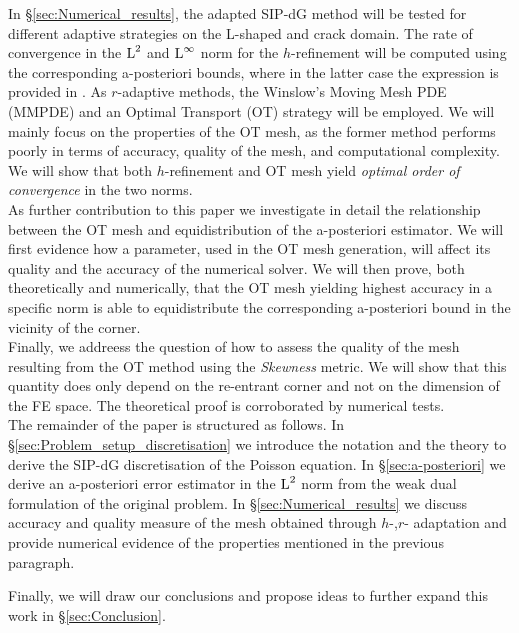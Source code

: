 \documentclass[a4paper,11pt]{article}
\begin{document}
{\begin{itemize}
\end{itemize}

In \S \ref{sec:Numerical_results}, the adapted SIP-dG method will be tested for different adaptive strategies on the L-shaped and crack domain. The rate of convergence in the $\operatorname L^{2}$ and $\operatorname L^{\infty}$ norm for the $h$-refinement will be computed using the corresponding a-posteriori bounds, where in the latter case the expression is provided in \cite{DG:2012}. As $r$-adaptive methods, the Winslow's Moving Mesh PDE (MMPDE) and an Optimal Transport (OT) strategy will be employed. We will mainly focus on the properties of the OT mesh, as the former method performs poorly in terms of accuracy, quality of the mesh, and computational complexity. We will show that both $h$-refinement and OT mesh yield \textit{optimal order of convergence} in the two norms. \\

As further contribution to this paper we investigate in detail the relationship between the OT mesh and equidistribution of the a-posteriori estimator. We will first evidence how a parameter, used in the OT mesh generation, will affect its quality and the accuracy of the numerical solver. We will then prove, both theoretically and numerically, that the OT mesh yielding highest accuracy in a specific norm is able to equidistribute the corresponding a-posteriori bound in the vicinity of the corner.\\

Finally, we addreess the question of how to assess the quality of the mesh resulting from the OT method using the \textit{Skewness} metric. We will show that this quantity does only depend on the re-entrant corner and not on the dimension of the FE space. The theoretical proof is corroborated by numerical tests.\\

The remainder of the paper is structured as follows. In \S \ref{sec:Problem_setup_discretisation} we introduce the notation and the theory to derive the SIP-dG discretisation of the Poisson equation. In \S \ref{sec:a-posteriori} we derive an a-posteriori error estimator in the $\operatorname L^{2}$ norm from the weak dual formulation of the original problem. In \S \ref{sec:Numerical_results} we discuss accuracy and quality measure of the mesh obtained through $h$-,$r$- adaptation and provide numerical evidence of the properties mentioned in the previous paragraph.

Finally, we will draw our conclusions and propose ideas to further expand this work in \S \ref{sec:Conclusion}.

}
\end{document}
